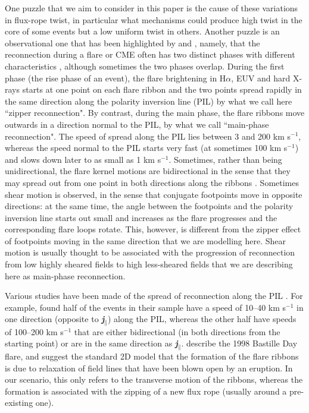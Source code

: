 \documentclass[10pt,namedreferneces]{SolarPhysics}
\begin{document}
\begin{article}
One puzzle that we aim to consider in this paper is the cause of these variations in flux-rope twist, in particular what mechanisms could produce high twist in the core of some events but a low uniform twist in others. 
Another puzzle is an observational one that has been highlighted by  and , namely,  that the reconnection during a flare or CME often has two distinct phases with different characteristics 
\cite{yang09,qiu09,qiu10}, although sometimes the two phases overlap. During the first phase (the rise phase of an event), the flare brightening in H$\alpha$, EUV and hard X-rays starts at one point on each flare ribbon and the two points spread rapidly in the same direction  along the polarity inversion line (PIL) by what we call here ``zipper reconnection". By contrast, during the main phase, the flare ribbons move outwards in a direction normal to the PIL, by what we call ``main-phase reconnection". The speed of spread along the PIL lies between 3 and 200 km s$^{-1}$, whereas the speed normal to the PIL starts very fast (at sometimes 100 km s$^{-1}$) and slows down later to as small as 1 km s$^{-1}$.   Sometimes, rather than being unidirectional, the flare kernel motions are bidirectional in the sense that they may spread out from one point in both directions along the ribbons \cite{su07,yang09}. Sometimes shear motion is observed, in the sense that conjugate footpoints move in opposite directions: at the same time,  the angle between the footpoints and the polarity inversion line starts out small and increases as the flare progresses and the corresponding flare loops rotate. This, however, is different from the zipper effect of footpoints moving in the same direction that we are modelling here. Shear motion is usually thought to be associated with the progression of reconnection from low highly sheared fields to high less-sheared fields that we are describing here as main-phase reconnection.

Various studies have been made of the spread of reconnection along the PIL \cite{vorpahl76,kitahara90,fletcher03,krucker03,fletcher04,bogachev05,tripathi06,su07,li09,qiu10,cheng12}. For example,  found half of the events in their sample  have a speed of 10--40 km s$^{-1}$ in one direction (opposite to \textbf{\textit {j}}$_{\parallel}$) along the PIL, whereas the other half have speeds of 100--200  km s$^{-1}$ that are either bidirectional (in both directions from the starting point) or are in the same direction as \textbf{\textit {j}}$_{\parallel}$.
 describe the 1998 Bastille Day flare, and suggest the standard 2D model that the formation of the flare ribbons is due to relaxation of field lines that have been blown open by an eruption. In our scenario, this only refers to the transverse motion of the ribbons, whereas the  formation is associated with the  zipping of a new flux rope (usually around a pre-existing one).


\end{article}
\end{document}
